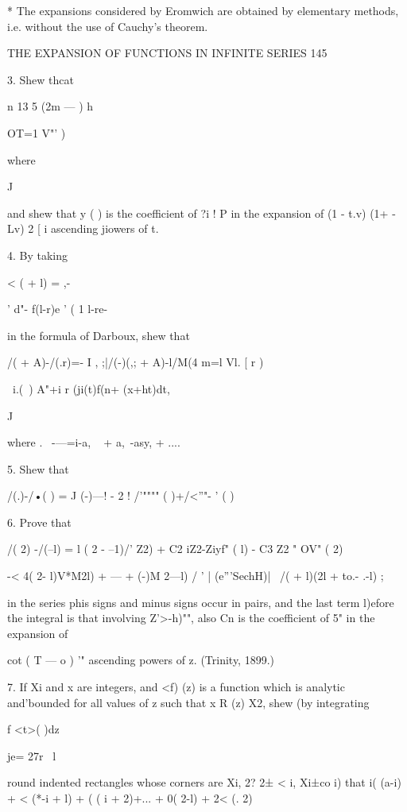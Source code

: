 {{* The expansions considered by Eromwich are obtained by elementary
methods, i.e. without the use of Cauchy's theorem.



THE EXPANSION OF FUNCTIONS IN INFINITE SERIES 145

3. Shew thcat

n 13 5 (2m — ) h

OT=1 V"' )



where



J



and shew that y ( ) is the coefficient of ?i ! P in the expansion of
(1 - t.v) (1+ - Lv) 2 [ i ascending jiowers of t.

4. By taking



< ( + l) = ,-



' d"- f(l-r)e ' ( 1 l-re-



in the formula of Darboux, shew that

/( + A)-/(.r)=- I , ;|/(-)(,; + A)-l/M(4 m=l Vl. [ r )

\ i.(\ ) A"+i r (ji(t)f(n+ (x+ht)dt,

J

where . \ -—=i-a, ~ + a,~-asy, + ....

5. Shew that

/(.)-/•( ) = J (-)—! - 2 ! /'"""" ( )+/<''"- ' ( )

6. Prove that

/( 2) -/(--l) = l ( 2 - --1)/' Z2) + C2 iZ2-Ziyf" ( l) - C3 Z2 " OV" (
2)

-< 4( 2- l)V*M2l) + --- + (-)M 2---l) / ' | (e'''SechH)| \ /( + l)(2l
+ to.- .-l) ;

in the series phis signs and minus signs occur in pairs, and the last
term l)efore the integral is that involving Z'>-h)"", also Cn is the
coefficient of 5" in the expansion of

cot ( T — o ) '" ascending powers of z. (Trinity, 1899.)

7. If Xi and x are integers, and <f) (z) is a function which is
analytic and'bounded for all values of z such that x R (z) X2, shew
(by integrating

f <t>( )dz

je= 27r \ l

round indented rectangles whose corners are Xi, 2? 2± < i, Xi±co i)
that i( (a-i) + < (*-i + l) + ( ( i + 2)+... + 0( 2-l) + 2< (. 2)

}}
